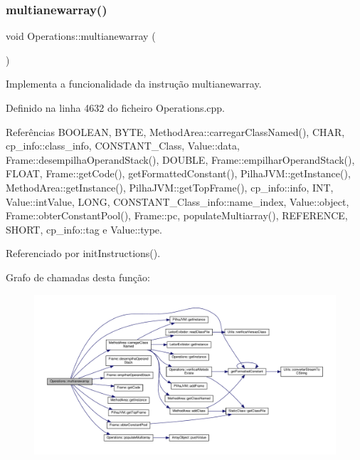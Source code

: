 \subsubsection{\texorpdfstring{multianewarray()}{multianewarray()}}
{\footnotesize\ttfamily void Operations\+::multianewarray (\begin{DoxyParamCaption}{ }\end{DoxyParamCaption})\hspace{0.3cm}{\ttfamily [private]}}



Implementa a funcionalidade da instrução multianewarray. 



Definido na linha 4632 do ficheiro Operations.\+cpp.



Referências B\+O\+O\+L\+E\+AN, B\+Y\+TE, Method\+Area\+::carregar\+Class\+Named(), C\+H\+AR, cp\+\_\+info\+::class\+\_\+info, C\+O\+N\+S\+T\+A\+N\+T\+\_\+\+Class, Value\+::data, Frame\+::desempilha\+Operand\+Stack(), D\+O\+U\+B\+LE, Frame\+::empilhar\+Operand\+Stack(), F\+L\+O\+AT, Frame\+::get\+Code(), get\+Formatted\+Constant(), Pilha\+J\+V\+M\+::get\+Instance(), Method\+Area\+::get\+Instance(), Pilha\+J\+V\+M\+::get\+Top\+Frame(), cp\+\_\+info\+::info, I\+NT, Value\+::int\+Value, L\+O\+NG, C\+O\+N\+S\+T\+A\+N\+T\+\_\+\+Class\+\_\+info\+::name\+\_\+index, Value\+::object, Frame\+::obter\+Constant\+Pool(), Frame\+::pc, populate\+Multiarray(), R\+E\+F\+E\+R\+E\+N\+CE, S\+H\+O\+RT, cp\+\_\+info\+::tag e Value\+::type.



Referenciado por init\+Instructions().

Grafo de chamadas desta função\+:\nopagebreak
\begin{figure}[H]
\begin{center}
\leavevmode
\includegraphics[width=350pt]{classOperations_a78c45edfcdf63668974ffc3b2d84a309_cgraph}
\end{center}
\end{figure}
\mbox{\label{classOperations_a3537f097b63240202ac0c9249dda33a9}} 
